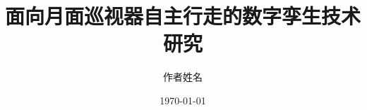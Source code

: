 \documentclass[UTF8,zihao=-4,a4paper,oneside,openany]{ctexrep}
\title{面向月面巡视器自主行走的数字孪生技术研究}
\author{作者姓名}
\date{\today}
\newif\iffastcompile
\begin{document}
	
	\maketitle
	\iffastcompile
	\else
	\tableofcontents
	\listoffigures
	\listoftables
	\fi
	
%	
%	
%	
%	
%	
%	
%	
%	
%	
%	
%	
%	
%	
%	
%	
%	
%	
%	
%	
%	
%	
	
	
	
	
	
	
	
	
	
	
	
	
	
	
	
\end{document}
